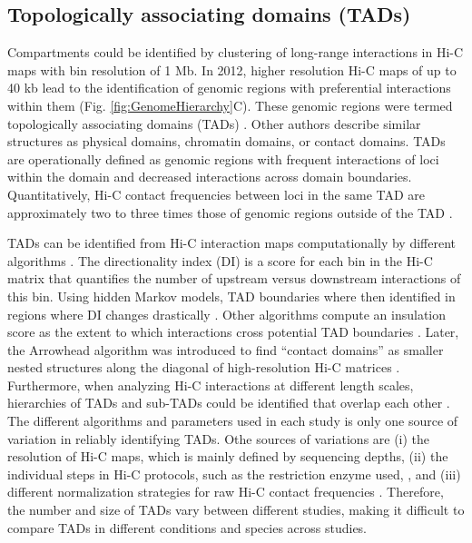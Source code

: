 \documentclass[a4paper,twoside=true,openright,parskip=full,chapterprefix=true,11pt,headings=normal,bibliography=totoc,listof=totoc,titlepage=on,captions=tableabove,draft=false]{scrreprt}
\theoremstyle{definition}
\theoremstyle{definition}
\theoremstyle{definition}
\theoremstyle{remark}
\begin{document}
\hypertarget{topologically-associating-domains-tads}{%
\subsection{Topologically associating domains
(TADs)}\label{topologically-associating-domains-tads}}

Compartments could be identified by clustering of long-range
interactions in Hi-C maps with bin resolution of 1 Mb. In 2012, higher
resolution Hi-C maps of up to 40 kb lead to the identification of
genomic regions with preferential interactions within them (Fig.
\ref{fig:GenomeHierarchy}C). These genomic regions were termed
topologically associating domains (TADs)
\citep{Dixon2012, Nora2012, Sexton2012}. Other authors describe similar
structures as physical domains, chromatin domains, or contact domains.
TADs are operationally defined as genomic regions with frequent
interactions of loci within the domain and decreased interactions across
domain boundaries. Quantitatively, Hi-C contact frequencies between loci
in the same TAD are approximately two to three times those of genomic
regions outside of the TAD \citep{Merkenschlager2016}.

TADs can be identified from Hi-C interaction maps computationally by
different algorithms \citep{Ay2015}. The directionality index (DI) is a
score for each bin in the Hi-C matrix that quantifies the number of
upstream versus downstream interactions of this bin. Using hidden Markov
models, TAD boundaries where then identified in regions where DI changes
drastically \citep{Dixon2012}. Other algorithms compute an insulation
score as the extent to which interactions cross potential TAD boundaries
\citep{Crane2015}. Later, the Arrowhead algorithm was introduced to find
``contact domains'' as smaller nested structures along the diagonal of
high-resolution Hi-C matrices \citep{Rao2014}. Furthermore, when
analyzing Hi-C interactions at different length scales, hierarchies of
TADs and sub-TADs could be identified that overlap each other
\citep{Filippova2014, Fraser2015}. The different algorithms and
parameters used in each study is only one source of variation in
reliably identifying TADs. Othe sources of variations are (i) the
resolution of Hi-C maps, which is mainly defined by sequencing depths,
(ii) the individual steps in Hi-C protocols, such as the restriction
enzyme used, \citep{Rao2014}, and (iii) different normalization
strategies for raw Hi-C contact frequencies
\citep{Dali2017, Forcato2017}. Therefore, the number and size of TADs
vary between different studies, making it difficult to compare TADs in
different conditions and species across studies.
\end{document}
